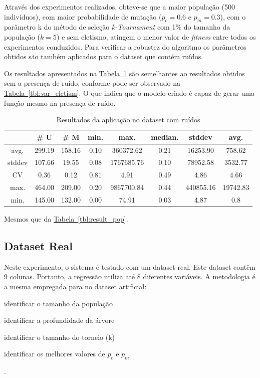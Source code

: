 \documentclass[a4paper]{article}
\begin{document}
Através dos experimentos realizados, obteve-se que a maior população (500
indivíduos), com maior probabilidade de mutação ($p_c=0.6$ e $p_m=0.3$), com o
parâmetro k do método de seleção \textit{k-Tournament} com 1\% do tamanho da
população ($k=5$) e sem eletismo, atingem o menor valor de \textit{fitness}
entre todos os experimentos conduzidos. Para verificar a robustez do algoritmo
os parâmetros obtidos são também aplicados para o dataset que contém ruídos.

Os resultados apresentados na
\hyperref[tbl:noise_dataset]{Tabela~\ref*{tbl:noise_dataset}} são semelhantes ao
resultados obtidos sem a presença de ruído, conforme pode ser observado na
\hyperref[tbl:var_eletism]{Tabela~\ref*{tbl:var_eletism}}. O que indica que o
modelo criado é capaz de gerar uma função mesmo na presença de ruído.

\begin{table}
  \center
  \caption{Resultados da aplicação no dataset com ruídos}
  \label{tbl:noise_dataset}
  \begin{tabular}{| c | c | c | c | c | c | c | c |}
    \hline
    &  \# U & \# M & min. & max. & median. & stddev & avg. \\ \hline 
avg. & 299.19 & 158.16 & 0.10 & 360372.62 & 0.21 & 16253.90 & 758.62 \\ \hline 
stddev & 107.66 & 19.55 & 0.08 & 1767685.76 & 0.10 & 78952.58 & 3532.77 \\ \hline 
CV & 0.36 & 0.12 & 0.81 & 4.91 & 0.49 & 4.86 & 4.66 \\ \hline 
max. & 464.00 & 209.00 & 0.20 & 9867700.84 & 0.44 & 440855.16 & 19742.83 \\ \hline 
min. & 145.00 & 132.00 & 0.00 & 74.91 & 0.03 & 4.87 & 0.8 \\ \hline
  \end{tabular}
  \begin{minipage}{0.7\textwidth}
    {\center \footnotesize
      Mesmos que da \hyperref[tbl:result_pop]{Tabela~\ref*{tbl:result_pop}}.
    }
  \end{minipage}
\end{table}

\subsection{Dataset Real}
Neste experimento, o sistema é testado com um dataset real. Este dataset contêm
9 colunas. Portanto, a regressão utiliza até 8 diferentes variáveis. A metodologia
é a mesma empregada para no dataset artificial:
\begin{ilist}
\item identificar o tamanho da população
\item identificar a profundidade da árvore
\item identificar o tamanho do torneio (k)
  \item identificar os melhores valores de $p_c$ e $p_m$
\end{ilist}.
\end{document}
